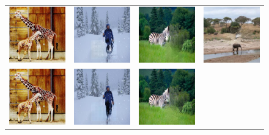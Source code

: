 \begin{figure}[H]
\begin{tabular}{cccc}
\includegraphics[width=.24\textwidth]{figures/random/000000153299_g.jpg}&
\includegraphics[width=.24\textwidth]{figures/random/000000266409_g.jpg}&
\includegraphics[width=.24\textwidth]{figures/random/000000270244_g.jpg}&
\includegraphics[width=.24\textwidth]{figures/random/000000286994_g.jpg} \\
\includegraphics[width=.24\textwidth]{figures/random/000000153299.png}&
\includegraphics[width=.24\textwidth]{figures/random/000000266409.png}&
\includegraphics[width=.24\textwidth]{figures/random/000000270244.png}&

\end{tabular}
\end{figure}
